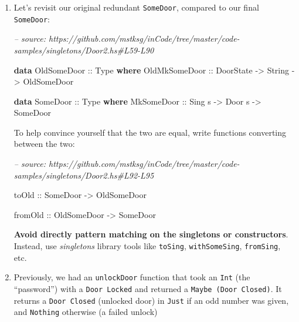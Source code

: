 \documentclass[]{article}
\newenvironment{Shaded}{}{}
\newcommand{\CommentTok}[1]{\textcolor[rgb]{0.38,0.63,0.69}{\textit{#1}}}
\newcommand{\DataTypeTok}[1]{\textcolor[rgb]{0.56,0.13,0.00}{#1}}
\newcommand{\KeywordTok}[1]{\textcolor[rgb]{0.00,0.44,0.13}{\textbf{#1}}}
\newcommand{\NormalTok}[1]{#1}
\newcommand{\OtherTok}[1]{\textcolor[rgb]{0.00,0.44,0.13}{#1}}
\begin{document}
\begin{enumerate}
\def\labelenumi{\arabic{enumi}.}
\item
  Let's revisit our original redundant \texttt{SomeDoor}, compared to our final
  \texttt{SomeDoor}:

\begin{Shaded}
\begin{Highlighting}[]
\CommentTok{-- source: https://github.com/mstksg/inCode/tree/master/code-samples/singletons/Door2.hs#L59-L90}

\KeywordTok{data} \DataTypeTok{OldSomeDoor}\OtherTok{ ::} \DataTypeTok{Type} \KeywordTok{where}
    \DataTypeTok{OldMkSomeDoor}\OtherTok{ ::} \DataTypeTok{DoorState} \OtherTok{->} \DataTypeTok{String} \OtherTok{->} \DataTypeTok{OldSomeDoor}

\KeywordTok{data} \DataTypeTok{SomeDoor}\OtherTok{ ::} \DataTypeTok{Type} \KeywordTok{where}
    \DataTypeTok{MkSomeDoor}\OtherTok{ ::} \DataTypeTok{Sing}\NormalTok{ s }\OtherTok{->} \DataTypeTok{Door}\NormalTok{ s }\OtherTok{->} \DataTypeTok{SomeDoor}
\end{Highlighting}
\end{Shaded}

  To help convince yourself that the two are equal, write functions converting
  between the two:

\begin{Shaded}
\begin{Highlighting}[]
\CommentTok{-- source: https://github.com/mstksg/inCode/tree/master/code-samples/singletons/Door2.hs#L92-L95}

\OtherTok{toOld ::} \DataTypeTok{SomeDoor} \OtherTok{->} \DataTypeTok{OldSomeDoor}

\OtherTok{fromOld ::} \DataTypeTok{OldSomeDoor} \OtherTok{->} \DataTypeTok{SomeDoor}
\end{Highlighting}
\end{Shaded}

  \textbf{Avoid directly pattern matching on the singletons or constructors}.
  Instead, use \emph{singletons} library tools like \texttt{toSing},
  \texttt{withSomeSing}, \texttt{fromSing}, etc.
\item
  Previously, we had an \texttt{unlockDoor} function that took an \texttt{Int}
  (the ``password'') with a \texttt{Door\ \textquotesingle{}Locked} and returned
  a \texttt{Maybe\ (Door\ \textquotesingle{}Closed)}. It returns a
  \texttt{Door\ \textquotesingle{}Closed} (unlocked door) in \texttt{Just} if an
  odd number was given, and \texttt{Nothing} otherwise (a failed unlock)


\end{enumerate}
\end{document}
